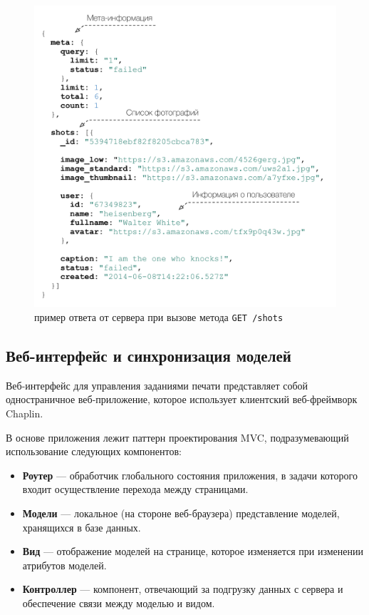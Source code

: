\documentclass[a4paper,14pt,href]{article}
\begin{document}
\begin{figure}[htbp]
\begin{center}
  \includegraphics[scale=0.7]{json-response.pdf}
    \caption{пример ответа от сервера при вызове метода \texttt{GET /shots}}
    \label{fig:JsonResponse}
\end{center}
\end{figure}


\subsection{Веб-интерфейс и синхронизация моделей}
Веб-интерфейс для управления заданиями печати представляет собой одностраничное веб-приложение, которое использует
клиентский веб-фреймворк Chaplin\cite{ChaplinJS}.

В основе приложения лежит паттерн проектирования MVC, подразумевающий использование следующих компонентов:
\begin{itemize}
  \item \textbf{Роутер} --- обработчик глобального состояния приложения, в задачи которого входит осуществление перехода между
    страницами.
  \item \textbf{Модели} --- локальное (на стороне веб-браузера) представление моделей, хранящихся в базе данных.
  \item \textbf{Вид} --- отображение моделей на странице, которое изменяется при изменении атрибутов моделей.
  \item \textbf{Контроллер} --- компонент, отвечающий за подгрузку данных с сервера и обеспечение связи между моделью и видом.
\end{itemize}
\end{document}
